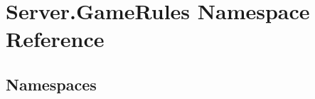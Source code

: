\hypertarget{namespace_server_1_1_game_rules}{}\section{Server.\+Game\+Rules Namespace Reference}
\label{namespace_server_1_1_game_rules}
\subsection*{Namespaces}
\begin{DoxyCompactItemize}
\end{DoxyCompactItemize}
